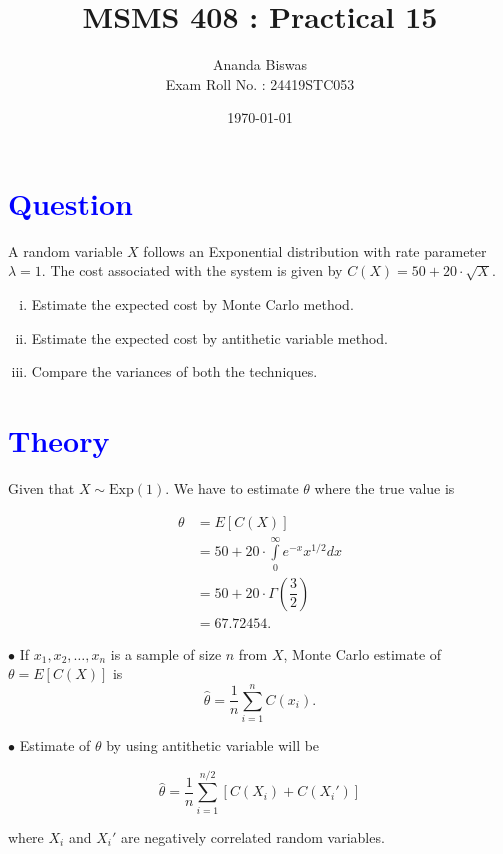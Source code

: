 \documentclass[11pt, a4paper]{article}\usepackage[]{graphicx}\usepackage[]{xcolor}
\title{MSMS 408 : Practical 15}
\author{{\fontsize{25}{20} \benyorithafont Ananda Biswas} \\[1em] Exam Roll No. : 24419STC053}
\date{\today}
\begin{document}
\maketitle


\section*{\faArrowAltCircleRight[regular] \textcolor{blue}{Question}}

A random variable $X$ follows an Exponential distribution with rate parameter $\lambda = 1$. The cost associated with the system is given by $C(X) = 50 + 20 \cdot \sqrt{X}$.

\begin{enumerate}[(i)]
\item Estimate the expected cost by Monte Carlo method.

\item Estimate the expected cost by antithetic variable method.

\item Compare the variances of both the techniques.
\end{enumerate}

\section*{\faArrowAltCircleRight[regular] \textcolor{blue}{Theory}}

Given that $X \sim \text{Exp}(1)$. We have to estimate $\theta$ where the true value is

\begin{align*}
\theta &= E[C(X)] \\[0.2em]
&= \displaystyle{50 + 20 \cdot \int \limits_{0}^{\infty} e^{-x} x^{1/2} dx} \\[0.5em]
&= 50 + 20 \cdot \Gamma\left( \dfrac{3}{2} \right) \\[0.5em]
&= 67.72454.
\end{align*}

$\bullet$ If $x_1, x_2, \ldots, x_n$ is a sample of size $n$ from $X$, Monte Carlo estimate of $\theta = E[C(X)]$ is $$\widehat{\theta} = \dfrac{1}{n} \sum \limits_{i = 1}^{n} C(x_i).$$

$\bullet$ Estimate of $\theta$ by using antithetic variable will be

$$\widehat{\theta} = \dfrac{1}{n} \sum \limits_{i = 1}^{n/2} [C(X_i) + C(X_i')]$$

where $X_i$ and $X_i'$ are negatively correlated random variables. \\[0.5em]
\end{document}
